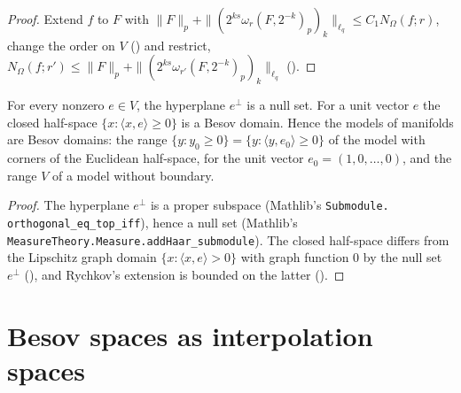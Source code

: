 \begin{proof}
\leanok
Extend $f$ to $F$ with $\|F\|_p + \|(2^{ks} \omega_r(F, 2^{-k})_p)_k\|_{\ell_q} \leq
C_1 N_\Omega(f; r)$, change the order on $V$ () and restrict,
$N_\Omega(f; r') \leq \|F\|_p + \|(2^{ks} \omega_{r'}(F, 2^{-k})_p)_k\|_{\ell_q}$
().
\end{proof}

\begin{theorem}
\label{thm:half-space-besov-domain}
\leanok
{}
For every nonzero $e \in V$, the hyperplane $e^\perp$ is a null set. For a unit vector $e$ the
closed half-space $\{x : \langle x, e \rangle \geq 0\}$ is a Besov domain. Hence the models of
manifolds are Besov domains: the range $\{y : y_0 \geq 0\} = \{y : \langle y, e_0 \rangle \geq 0\}$
of the model with corners of the Euclidean half-space, for the unit vector
$e_0 = (1, 0, \dots, 0)$, and the range $V$ of a model without boundary.
\end{theorem}

\begin{proof}
\leanok
The hyperplane $e^\perp$ is a proper subspace (Mathlib's \texttt{Submodule.\allowbreak
orthogonal\_\allowbreak eq\_\allowbreak top\_\allowbreak iff}), hence a null set (Mathlib's
\texttt{MeasureTheory.\allowbreak Measure.\allowbreak addHaar\_\allowbreak submodule}). The closed
half-space differs from the Lipschitz graph domain $\{x : \langle x, e \rangle > 0\}$ with graph
function $0$ by the null set $e^\perp$ (), and Rychkov's
extension is bounded on the latter ().
\end{proof}

\section{Besov spaces as interpolation spaces}
\label{sec:rd-besov-interpolation}

